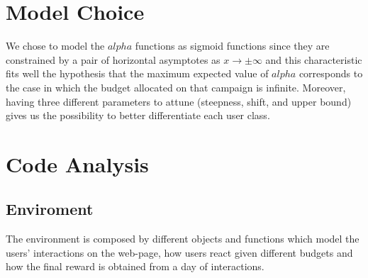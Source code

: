 \section{Model Choice}
\label{sec:env_Motivation}

We chose to model the $alpha$ functions as sigmoid functions since they are constrained by a pair of horizontal asymptotes as $ x\to\pm\infty$  and this characteristic fits well the hypothesis that the maximum expected value of $alpha$ corresponds to the case in which the budget allocated on that campaign is infinite. Moreover, having three different parameters to attune (steepness, shift, and upper bound) gives us the possibility to better differentiate each user class.

\section{Code Analysis}
\label{sec:env_Code Analysis}

    \subsection{Enviroment}
    The environment is composed by different objects and functions which model the users' interactions on the web-page, how users react given different budgets and how the final reward is obtained from a day of interactions.

